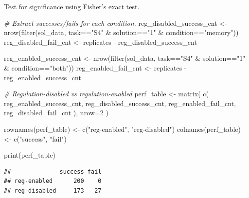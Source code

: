 \documentclass[
]{book}
\newenvironment{Shaded}{\begin{snugshade}}{\end{snugshade}}
\newcommand{\AttributeTok}[1]{\textcolor[rgb]{0.77,0.63,0.00}{#1}}
\newcommand{\CommentTok}[1]{\textcolor[rgb]{0.56,0.35,0.01}{\textit{#1}}}
\newcommand{\DecValTok}[1]{\textcolor[rgb]{0.00,0.00,0.81}{#1}}
\newcommand{\FunctionTok}[1]{\textcolor[rgb]{0.00,0.00,0.00}{#1}}
\newcommand{\NormalTok}[1]{#1}
\newcommand{\OtherTok}[1]{\textcolor[rgb]{0.56,0.35,0.01}{#1}}
\newcommand{\SpecialCharTok}[1]{\textcolor[rgb]{0.00,0.00,0.00}{#1}}
\newcommand{\StringTok}[1]{\textcolor[rgb]{0.31,0.60,0.02}{#1}}
\begin{document}
Test for significance using Fisher's exact test.

\begin{Shaded}
\begin{Highlighting}[]
\CommentTok{\# Extract successes/fails for each condition.}
\NormalTok{reg\_disabled\_success\_cnt }\OtherTok{\textless{}{-}} \FunctionTok{nrow}\NormalTok{(}\FunctionTok{filter}\NormalTok{(sol\_data, task}\SpecialCharTok{==}\StringTok{"S4"} \SpecialCharTok{\&}\NormalTok{ solution}\SpecialCharTok{==}\StringTok{"1"} \SpecialCharTok{\&}\NormalTok{ condition}\SpecialCharTok{==}\StringTok{"memory"}\NormalTok{))}
\NormalTok{reg\_disabled\_fail\_cnt }\OtherTok{\textless{}{-}}\NormalTok{ replicates }\SpecialCharTok{{-}}\NormalTok{ reg\_disabled\_success\_cnt}

\NormalTok{reg\_enabled\_success\_cnt }\OtherTok{\textless{}{-}} \FunctionTok{nrow}\NormalTok{(}\FunctionTok{filter}\NormalTok{(sol\_data, task}\SpecialCharTok{==}\StringTok{"S4"} \SpecialCharTok{\&}\NormalTok{ solution}\SpecialCharTok{==}\StringTok{"1"} \SpecialCharTok{\&}\NormalTok{ condition}\SpecialCharTok{==}\StringTok{"both"}\NormalTok{))}
\NormalTok{reg\_enabled\_fail\_cnt }\OtherTok{\textless{}{-}}\NormalTok{ replicates }\SpecialCharTok{{-}}\NormalTok{ reg\_enabled\_success\_cnt}

\CommentTok{\# Regulation{-}disabled vs regulation{-}enabled}
\NormalTok{perf\_table }\OtherTok{\textless{}{-}} \FunctionTok{matrix}\NormalTok{(}
  \FunctionTok{c}\NormalTok{(}
\NormalTok{    reg\_enabled\_success\_cnt,}
\NormalTok{    reg\_disabled\_success\_cnt,}
\NormalTok{    reg\_enabled\_fail\_cnt,}
\NormalTok{    reg\_disabled\_fail\_cnt}
\NormalTok{    ),}
    \AttributeTok{nrow=}\DecValTok{2}
\NormalTok{)}

\FunctionTok{rownames}\NormalTok{(perf\_table) }\OtherTok{\textless{}{-}} \FunctionTok{c}\NormalTok{(}\StringTok{"reg{-}enabled"}\NormalTok{, }\StringTok{"reg{-}disabled"}\NormalTok{)}
\FunctionTok{colnames}\NormalTok{(perf\_table) }\OtherTok{\textless{}{-}} \FunctionTok{c}\NormalTok{(}\StringTok{"success"}\NormalTok{, }\StringTok{"fail"}\NormalTok{)}

\FunctionTok{print}\NormalTok{(perf\_table)}
\end{Highlighting}
\end{Shaded}

\begin{verbatim}
##              success fail
## reg-enabled      200    0
## reg-disabled     173   27
\end{verbatim}
\end{document}
